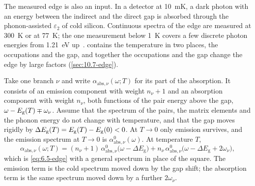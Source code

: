 The measured edge is also an input. In a detector at \SI{10}{mK}, a dark photon with an energy between the indirect and the direct gap is absorbed through the phonon-assisted $\varepsilon_2$ of cold silicon. Continuous spectra of the edge are measured at \SI{300}{K} or at \SI{77}{K}; the one measurement below \SI{1}{K} covers a few discrete photon energies from \SI{1.21}{eV} up~\cite{stanford2021photoelectric}.  contains the temperature in two places, the occupations and the gap, and together the occupations and the gap change the edge by large factors (\cref{sec:10.7-edge}).

Take one branch $\nu$ and write $\alpha_{\mathrm{abs},\nu}(\omega;T)$ for its part of the absorption. It consists of an emission component with weight $n_\nu + 1$ and an absorption component with weight $n_\nu$, both functions of the pair energy above the gap, $\omega - E_{\mathrm{g}}(T) \mp \omega_\nu$. Assume that the spectrum of the pairs, the matrix elements and the phonon energy do not change with temperature, and that the gap moves rigidly by $\Delta E_{\mathrm{g}}(T) = E_{\mathrm{g}}(T) - E_{\mathrm{g}}(0) < 0$. At $T \to 0$ only emission survives, and the emission spectrum at $T \to 0$ is $\alpha^0_{\mathrm{abs},\nu}(\omega)$. At temperature $T$,
\begin{equation}
  \alpha_{\mathrm{abs},\nu}(\omega;T) = (n_\nu + 1)\,\alpha^0_{\mathrm{abs},\nu}\bigl(\omega - \Delta E_{\mathrm{g}}\bigr) + n_\nu\,\alpha^0_{\mathrm{abs},\nu}\bigl(\omega - \Delta E_{\mathrm{g}} + 2\omega_\nu\bigr) ,
  \label{eq:13.5-forward}
\end{equation}
which is \cref{eq:6.5-edge} with a general spectrum in place of the square. The emission term is the cold spectrum moved down by the gap shift; the absorption term is the same spectrum moved down by a further $2\omega_\nu$.

